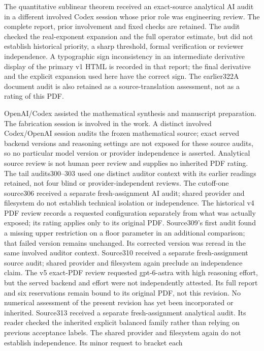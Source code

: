 \documentclass[11pt]{article}
\begin{document}
The quantitative sublinear theorem received an exact-source analytical
AI audit in a different involved Codex session whose prior role was
engineering review. The complete report, prior involvement and fixed checks
are retained. The audit checked the real-exponent expansion and the full
operator estimate, but did not establish historical priority, a sharp
threshold, formal verification or reviewer independence. A typographic sign
inconsistency in an intermediate derivative display of the primary v1 HTML
is recorded in that report; the final derivative and the explicit expansion
used here have the correct sign. The earlier322A document audit is also
retained as a source-translation assessment, not as a rating of this PDF.

OpenAI/Codex assisted the mathematical synthesis and manuscript preparation.
The fabrication session is involved in the work. A distinct involved
Codex/OpenAI session audits the frozen mathematical source; exact served
backend versions and reasoning settings are not exposed for these source
audits, so no particular
model version or provider independence is asserted. Analytical source
review is not human peer review and supplies no inherited PDF rating.
The tail audits300--303 used one distinct auditor context with its earlier
readings retained, not four blind or provider-independent reviews. The
cutoff-one source306 received a separate fresh-assignment AI audit;
shared provider and filesystem do not establish technical isolation or
independence. The
historical v4 PDF review records a requested configuration separately from
what was actually exposed; its rating applies only to its original PDF.
Source309's first audit found a missing upper restriction on a floor
parameter in an additional comparison; that failed version remains
unchanged. Its corrected version was reread in the same involved auditor
context. Source310 received a separate fresh-assignment source audit;
shared provider and filesystem again preclude an independence claim.
The v5 exact-PDF review requested gpt-6-astra with high reasoning effort,
but the served backend and effort were not independently attested.
Its full report and six reservations remain bound to its original PDF,
not this revision. No numerical assessment of the present revision
has yet been incorporated or inherited.
Source313 received a separate fresh-assignment analytical audit. Its
reader checked the inherited explicit balanced family rather than relying
on previous acceptance labels. The shared provider and filesystem again
do not establish independence. Its minor request to bracket each
\end{document}
